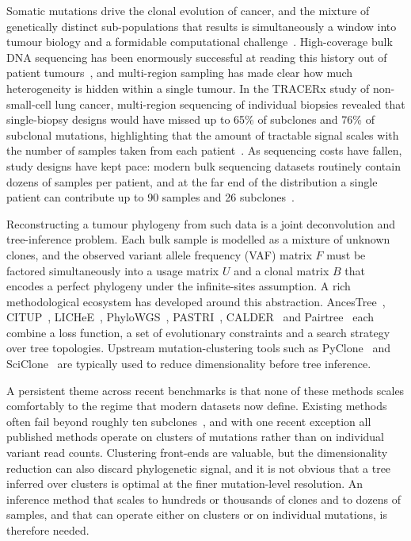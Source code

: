 \documentclass[11pt]{article}
\begin{document}
Somatic mutations drive the clonal evolution of cancer, and the mixture of genetically distinct sub-populations that results is simultaneously a window into tumour biology and a formidable computational challenge~\citep{nowell1976clonal,mcgranahan2017clonal}. High-coverage bulk DNA sequencing has been enormously successful at reading this history out of patient tumours~\citep{nikzainal2012life,gerlinger2012intratumor}, and multi-region sampling has made clear how much heterogeneity is hidden within a single tumour. In the TRACERx study of non-small-cell lung cancer, multi-region sequencing of individual biopsies revealed that single-biopsy designs would have missed up to 65\% of subclones and 76\% of subclonal mutations, highlighting that the amount of tractable signal scales with the number of samples taken from each patient~\citep{jamalhanjani2017tracking}. As sequencing costs have fallen, study designs have kept pace: modern bulk sequencing datasets routinely contain dozens of samples per patient, and at the far end of the distribution a single patient can contribute up to 90 samples and 26 subclones~\citep{wintersinger2022pairtree}.

Reconstructing a tumour phylogeny from such data is a joint deconvolution and tree-inference problem. Each bulk sample is modelled as a mixture of unknown clones, and the observed variant allele frequency (VAF) matrix $F$ must be factored simultaneously into a usage matrix $U$ and a clonal matrix $B$ that encodes a perfect phylogeny under the infinite-sites assumption. A rich methodological ecosystem has developed around this abstraction. AncesTree~\citep{elkebir2015reconstruction}, CITUP~\citep{malikic2015citup}, LICHeE~\citep{popic2015lichee}, PhyloWGS~\citep{deshwar2015phylowgs}, PASTRI~\citep{satas2017pastri}, CALDER~\citep{myers2019calder} and Pairtree~\citep{wintersinger2022pairtree} each combine a loss function, a set of evolutionary constraints and a search strategy over tree topologies. Upstream mutation-clustering tools such as PyClone~\citep{roth2014pyclone} and SciClone~\citep{miller2014sciclone} are typically used to reduce dimensionality before tree inference.

A persistent theme across recent benchmarks is that none of these methods scales comfortably to the regime that modern datasets now define. Existing methods often fail beyond roughly ten subclones~\citep{wintersinger2022pairtree}, and with one recent exception all published methods operate on clusters of mutations rather than on individual variant read counts. Clustering front-ends are valuable, but the dimensionality reduction can also discard phylogenetic signal, and it is not obvious that a tree inferred over clusters is optimal at the finer mutation-level resolution. An inference method that scales to hundreds or thousands of clones and to dozens of samples, and that can operate either on clusters or on individual mutations, is therefore needed.
\end{document}
